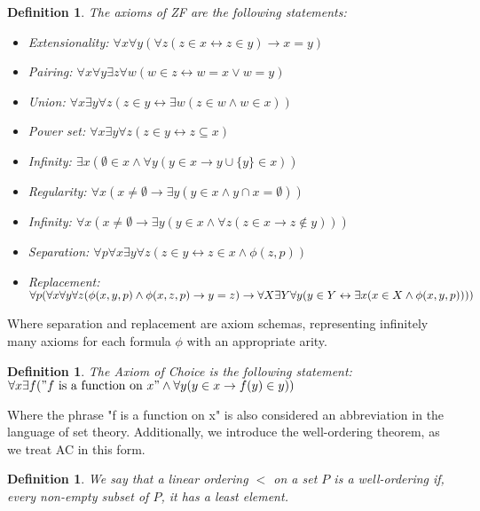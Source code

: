 \documentclass{report}
\newtheorem{dfn}[thm]{Definition}
\begin{document}
\begin{dfn}
  The axioms of ZF are the following statements:
  \begin{itemize}
    \item Extensionality: $\forall x \forall y (\forall z (z \in x \leftrightarrow z \in y) \rightarrow x = y)$
    \item Pairing: $\forall x \forall y \exists z \forall w (w \in z \leftrightarrow w = x \lor w = y)$
    \item Union: $\forall x \exists y \forall z (z \in y \leftrightarrow \exists w (z \in w \land w \in x))$
    \item Power set: $\forall x \exists y \forall z (z \in y \leftrightarrow z \subseteq x)$
    \item Infinity: $\exists x (\emptyset \in x \land \forall y (y \in x \rightarrow y \cup \{y\} \in x))$
    \item Regularity: $\forall x(x \neq \emptyset \rightarrow \exists y (y \in x \land y \cap x = \emptyset))$
    \item Infinity: $\forall x (x \neq \emptyset \rightarrow \exists y (y \in x \land \forall z (z \in x \rightarrow z \notin y)))$
    \item Separation: $\forall p \forall x \exists y \forall z (z \in y \leftrightarrow z \in x \land \phi(z, p))$
    \item Replacement: $\forall p (\forall x \forall y \forall z (\phi(x, y, p) \land \phi(x, z, p) \rightarrow y = z) \rightarrow \\ \forall X \exists Y \forall y (y \in Y \leftrightarrow \exists x (x \in X \land \phi(x, y, p))))$
  \end{itemize}
\end{dfn}
Where separation and replacement are axiom schemas, representing infinitely many axioms for each formula $\phi$ with an appropriate arity.
\begin{dfn} 
  \emph{The Axiom of Choice} is the following statement: \\
  $\forall x \exists f (\mathrm{"} f \text{ is a function on } x \mathrm{"} \land \forall y (y \in x \rightarrow f(y) \in y))$
\end{dfn}
Where the phrase "f is a function on x" is also considered an abbreviation in the language of set theory.
Additionally, we introduce the well-ordering theorem, as we treat AC in this form.

\begin{dfn}
  We say that a linear ordering $<$ on a set $P$ is a \emph{well-ordering} if, every non-empty subset of $P$, it has a least element.
\end{dfn}
\end{document}
